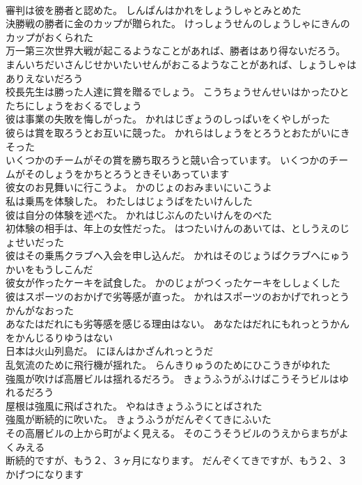 \documentclass[8pt]{extreport}
\begin{document}
\begin{CJK}{UTF8}{min}
\\	審判は彼を勝者と認めた。	しんぱんはかれをしょうしゃとみとめた 
\\	決勝戦の勝者に金のカップが贈られた。	けっしょうせんのしょうしゃにきんのカップがおくられた 
\\	万一第三次世界大戦が起こるようなことがあれば、勝者はあり得ないだろう。	まんいちだいさんじせかいたいせんがおこるようなことがあれば、しょうしゃはありえないだろう 
\\	校長先生は勝った人達に賞を贈るでしょう。	こうちょうせんせいはかったひとたちにしょうをおくるでしょう 
\\	彼は事業の失敗を悔しがった。	かれはじぎょうのしっぱいをくやしがった 
\\	彼らは賞を取ろうとお互いに競った。	かれらはしょうをとろうとおたがいにきそった 
\\	いくつかのチームがその賞を勝ち取ろうと競い合っています。	いくつかのチームがそのしょうをかちとろうときそいあっています 
\\	彼女のお見舞いに行こうよ。	かのじょのおみまいにいこうよ 
\\	私は乗馬を体験した。	わたしはじょうばをたいけんした 
\\	彼は自分の体験を述べた。	かれはじぶんのたいけんをのべた 
\\	初体験の相手は、年上の女性だった。	はつたいけんのあいては、としうえのじょせいだった 
\\	彼はその乗馬クラブへ入会を申し込んだ。	かれはそのじょうばクラブへにゅうかいをもうしこんだ 
\\	彼女が作ったケーキを試食した。	かのじょがつくったケーキをししょくした 
\\	彼はスポーツのおかげで劣等感が直った。	かれはスポーツのおかげでれっとうかんがなおった 
\\	あなたはだれにも劣等感を感じる理由はない。	あなたはだれにもれっとうかんをかんじるりゆうはない 
\\	日本は火山列島だ。	にほんはかざんれっとうだ 
\\	乱気流のために飛行機が揺れた。	らんきりゅうのためにひこうきがゆれた 
\\	強風が吹けば高層ビルは揺れるだろう。	きょうふうがふけばこうそうビルはゆれるだろう 
\\	屋根は強風に飛ばされた。	やねはきょうふうにとばされた 
\\	強風が断続的に吹いた。	きょうふうがだんぞくてきにふいた 
\\	その高層ビルの上から町がよく見える。	そのこうそうビルのうえからまちがよくみえる 
\\	断続的ですが、もう２、３ヶ月になります。	だんぞくてきですが、もう２、３かげつになります 

\end{CJK}
\end{document}
